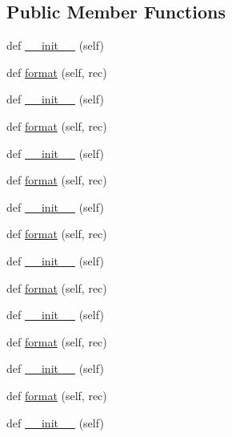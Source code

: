 \subsection*{Public Member Functions}
\begin{DoxyCompactItemize}
\item 
def \hyperlink{classwaflib_1_1_logs_1_1formatter_afbcedff8208ba773174ac143a56949b2}{\+\_\+\+\_\+init\+\_\+\+\_\+} (self)
\item 
def \hyperlink{classwaflib_1_1_logs_1_1formatter_a7a117bfb2e79abef5415f5e63694015e}{format} (self, rec)
\item 
def \hyperlink{classwaflib_1_1_logs_1_1formatter_afbcedff8208ba773174ac143a56949b2}{\+\_\+\+\_\+init\+\_\+\+\_\+} (self)
\item 
def \hyperlink{classwaflib_1_1_logs_1_1formatter_a7a117bfb2e79abef5415f5e63694015e}{format} (self, rec)
\item 
def \hyperlink{classwaflib_1_1_logs_1_1formatter_afbcedff8208ba773174ac143a56949b2}{\+\_\+\+\_\+init\+\_\+\+\_\+} (self)
\item 
def \hyperlink{classwaflib_1_1_logs_1_1formatter_a7a117bfb2e79abef5415f5e63694015e}{format} (self, rec)
\item 
def \hyperlink{classwaflib_1_1_logs_1_1formatter_afbcedff8208ba773174ac143a56949b2}{\+\_\+\+\_\+init\+\_\+\+\_\+} (self)
\item 
def \hyperlink{classwaflib_1_1_logs_1_1formatter_a7a117bfb2e79abef5415f5e63694015e}{format} (self, rec)
\item 
def \hyperlink{classwaflib_1_1_logs_1_1formatter_afbcedff8208ba773174ac143a56949b2}{\+\_\+\+\_\+init\+\_\+\+\_\+} (self)
\item 
def \hyperlink{classwaflib_1_1_logs_1_1formatter_a7a117bfb2e79abef5415f5e63694015e}{format} (self, rec)
\item 
def \hyperlink{classwaflib_1_1_logs_1_1formatter_afbcedff8208ba773174ac143a56949b2}{\+\_\+\+\_\+init\+\_\+\+\_\+} (self)
\item 
def \hyperlink{classwaflib_1_1_logs_1_1formatter_a7a117bfb2e79abef5415f5e63694015e}{format} (self, rec)
\item 
def \hyperlink{classwaflib_1_1_logs_1_1formatter_afbcedff8208ba773174ac143a56949b2}{\+\_\+\+\_\+init\+\_\+\+\_\+} (self)
\item 
def \hyperlink{classwaflib_1_1_logs_1_1formatter_a7a117bfb2e79abef5415f5e63694015e}{format} (self, rec)
\item 
def \hyperlink{classwaflib_1_1_logs_1_1formatter_afbcedff8208ba773174ac143a56949b2}{\+\_\+\+\_\+init\+\_\+\+\_\+} (self)

\end{DoxyCompactItemize}
